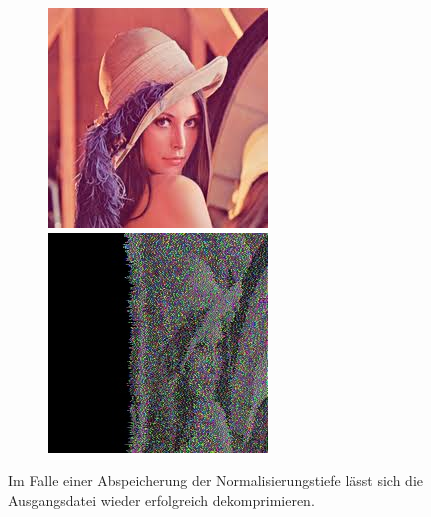 \documentclass[a4paper,12pt]{article}
\begin{document}
\begin{figure}[h]
    \centering
\begin{minipage}[h]{.45\linewidth}
\centering
\includegraphics[width=0.55\linewidth]{preconditioning/lena}
\end{minipage}
\hfill
\begin{minipage}[h]{0.45\linewidth}
\centering
\includegraphics[width=0.55\linewidth]{preconditioning/lena_ON}
\end{minipage}
\end{figure}
\par
\vspace{1cm}
Im Falle einer Abspeicherung der Normalisierungstiefe lässt sich die Ausgangsdatei wieder erfolgreich dekomprimieren.

\newpage
\end{document}
